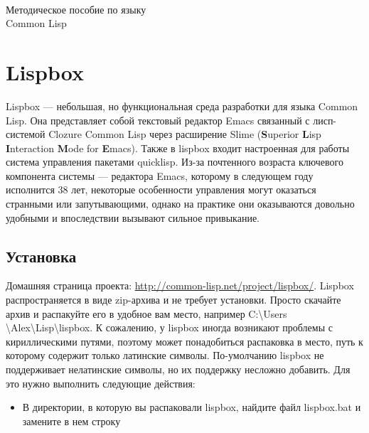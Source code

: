 \documentclass[a4paper, 12pt, titlepage, twoside]{article}
\begin{document}
\newcommand{\lisp}[1]{\texttt{#1}}
\newcommand{\lispex}[2]{\lisp{#1} $\longrightarrow$ \lisp{#2}}

\pagestyle{fancy}
\fancyhead{}
\fancyhead[LE,RO]{\bfseries \thepage}
\fancyhead[RE]{\slshape \nouppercase{\leftmark}}
\fancyhead[LO]{\slshape \nouppercase{\rightmark}}
\fancyfoot{}

\begin{titlepage}
  \begin{center}
    \vspace{10pt}
    
    \\
    \vspace{120pt}
    \Huge{Методическое пособие по языку\\Common Lisp}
    \end{center}
\end{titlepage}

\tableofcontents
\newpage

\section{Lispbox}
Lispbox --- небольшая, но функциональная среда разработки для языка Common Lisp. Она представляет собой текстовый редактор Emacs связанный с лисп-системой Clozure Common Lisp через расширение Slime (\textbf{S}uperior \textbf{L}isp \textbf{I}nteraction \textbf{M}ode for \textbf{E}macs). Также в lispbox входит настроенная для работы система управления пакетами quicklisp. Из-за почтенного возраста ключевого компонента системы --- редактора Emacs, которому в следующем году исполнится 38 лет, некоторые особенности управления могут оказаться странными или запутывающими, однако на практике они оказываются довольно удобными и впоследствии вызывают сильное привыкание.
\subsection{Установка}
Домашняя страница проекта: \url{http://common-lisp.net/project/lispbox/}. Lispbox распространяется в виде zip-архива и не требует установки. Просто скачайте архив и распакуйте его в удобное вам место, например C:\textbackslash{}Users
\textbackslash{}Alex\textbackslash{}Lisp\textbackslash{}lispbox. К сожалению, у lispbox иногда возникают проблемы с кириллическими путями, поэтому может понадобиться распаковка в место, путь к которому содержит только латинские символы.
По-умолчанию lispbox не поддерживает нелатинские символы, но их поддержку несложно добавить. Для это нужно выполнить следующие действия:
\begin{itemize}
\item В директории, в которую вы распаковали lispbox, найдите файл lispbox.bat и замените в нем строку 
\end{itemize} %
\end{document}
